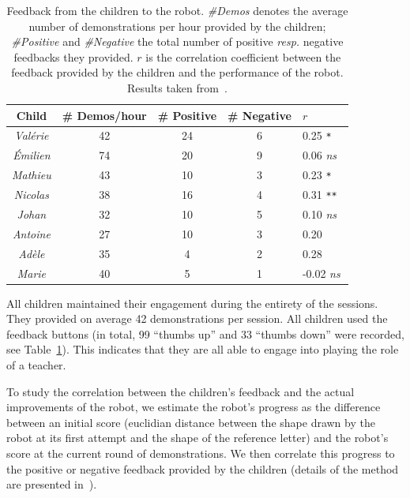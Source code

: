\documentclass{article}
\newcommand{\resp}{\textit{resp.}\xspace}
\begin{document}
\begin{table}
    \centering
    \begin{tabular}{ccccl}
        \toprule
        \bf Child      & \bf \# Demos/hour & \bf \# Positive & \bf \# Negative & $r$ \\ \midrule
        \emph{Valérie} & 42           & 24              & 6               & 0.25 \small\tt **  \\ 
        \emph{Émilien} & 74           & 20              & 9               & 0.06 \small\it ns  \\
        \emph{Mathieu} & 43           & 10              & 3               & 0.23 \small\tt **  \\
        \emph{Nicolas} & 38           & 16              & 4               & 0.31 \small\tt *** \\
        \emph{Johan}   & 32           & 10              & 5               & 0.10 \small\it ns  \\
        \emph{Antoine} & 27           & 10              & 3               & 0.20 \small\tt *   \\
        \emph{Adèle}   & 35           & 4               & 2               & 0.28 \small\tt *   \\
        \emph{Marie}   & 40           & 5               & 1               & -0.02 \small\it ns \\ \bottomrule
    \end{tabular}
    \caption{\small Feedback from the children to the robot. \emph{\#Demos}
        denotes the average number of demonstrations per hour provided by the children;
        \emph{\#Positive} and \emph{\#Negative} the total number of positive \resp
        negative feedbacks they provided. $r$ is the correlation coefficient
        between the feedback provided by the children and the performance of the
        robot. Results taken from~\cite{jacq2016building}.}

    \label{table:scores}
\end{table}

All children maintained their engagement during the entirety of the sessions. They
provided on average 42 demonstrations per session. All children used the
feedback buttons (in total, 99 ``thumbs up'' and 33 ``thumbs down'' were recorded,
see Table~\ref{table:scores}). This indicates that they are all able to engage
into playing the role of a teacher.

To study the correlation between the children's feedback and the actual
improvements of the robot, we estimate the robot's progress as the difference
between an initial score (euclidian distance between the shape drawn by
the robot at its first attempt and the shape of the reference letter) and the
robot's score at the current round of demonstrations. We then correlate this
progress to the positive or negative feedback provided by the children (details
of the method are presented in~\cite{jacq2016building}).
\end{document}
